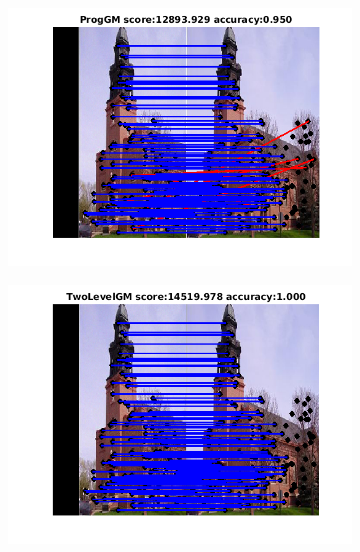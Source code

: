 \documentclass[
	fontsize=12pt,
	paper=a4,
	twoside=false,
	numbers=noenddot,
	plainheadsepline,
	toc=listof,
	toc=bibliography
]{scrartcl}
\begin{document}
\begin{figure}[h]
	\begin{subfigure}[b]{0.3\textwidth}
		\centering
		\includegraphics[scale=0.4]{"fig_ver2608/RealImages/Img_trafo/no_descr/using_cdf_afftrafo/fi_3_ProgGM"} 
	\end{subfigure}%
	\begin{subfigure}[b]{0.3\textwidth}
		\centering
		\includegraphics[scale=0.4]{"fig_ver2608/RealImages/Img_trafo/no_descr/using_cdf_afftrafo/fi_3_2lGM"} 
	\end{subfigure} 
	\begin{subfigure}[b]{0.3\textwidth}
		\centering

\end{subfigure}
\end{figure}
\end{document}
